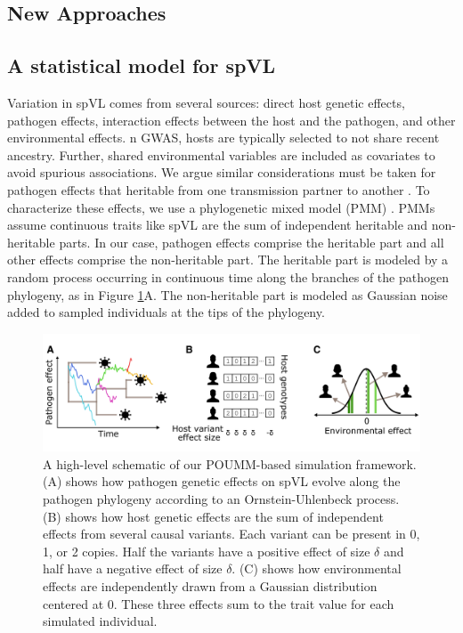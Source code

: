 \documentclass[11pt]{article}
\begin{document}
\begin{linenumbers}
\section*{New Approaches}
\subsection*{A statistical model for spVL}

Variation in spVL comes from several sources: direct host genetic effects, pathogen effects, interaction effects between the host and the pathogen, and other environmental effects. n GWAS, hosts are typically selected to not share recent ancestry. Further, shared environmental variables are included as covariates to avoid spurious associations. We argue similar considerations must be taken
for pathogen effects that heritable from one transmission partner to another \citep{Leventhal2016}. To characterize these effects, we use a phylogenetic mixed model (PMM) \citep{Housworth2004}. PMMs assume continuous traits like spVL are the sum of independent heritable and non-heritable parts. In our case, pathogen effects comprise the heritable part and all other effects comprise the non-heritable part. The heritable part is modeled by a random process occurring in continuous time along the branches of the pathogen phylogeny, as in Figure \ref{fig:spVLModel}A. The non-heritable part is modeled as Gaussian noise added to sampled individuals at the tips of the phylogeny.

\begin{figure}[H]
	\begin{center}
	\includegraphics[width = \linewidth]{figures/simulation_setup.png}
	\caption{A high-level schematic of our POUMM-based simulation framework. (A) shows how pathogen genetic effects on spVL evolve along the pathogen phylogeny according to an Ornstein-Uhlenbeck process. (B) shows how host genetic effects are the sum of independent effects from several causal variants. Each variant can be present in 0, 1, or 2 copies. Half the variants have a positive effect of size $\delta$ and half have a negative effect of size $\delta$. (C) shows how environmental effects are independently drawn from a Gaussian distribution centered at 0. These three effects sum to the trait value for each simulated individual.}
		\label{fig:spVLModel}
	\end{center}
\end{figure}


\end{linenumbers}
\end{document}
